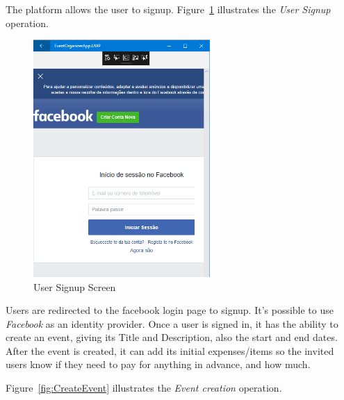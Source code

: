 The platform allows the user to signup. Figure~\ref{fig:UserSignupScreenShot} illustrates the \textit{User Signup} operation.

\begin{figure}[!ht]
	\centering
	\includegraphics[width=0.60\textwidth,height=0.50\textheight]{./Chapter3/Figures/ClientAppScreenShots/Signup01}
	\caption{User Signup Screen}
	\label{fig:UserSignupScreenShot}
\end{figure}

\newpage
Users are redirected to the facebook login page to signup. It's possible to use \textit{Facebook} as an identity provider.
Once a user is signed in, it has the ability to create an event, giving its Title and Description, also the start and end dates. After the event is created, it can add its initial expenses/items so the invited users know if they need to pay for anything in advance, and how much.

Figure~\ref{fig:CreateEvent} illustrates the \textit{Event creation} operation.

